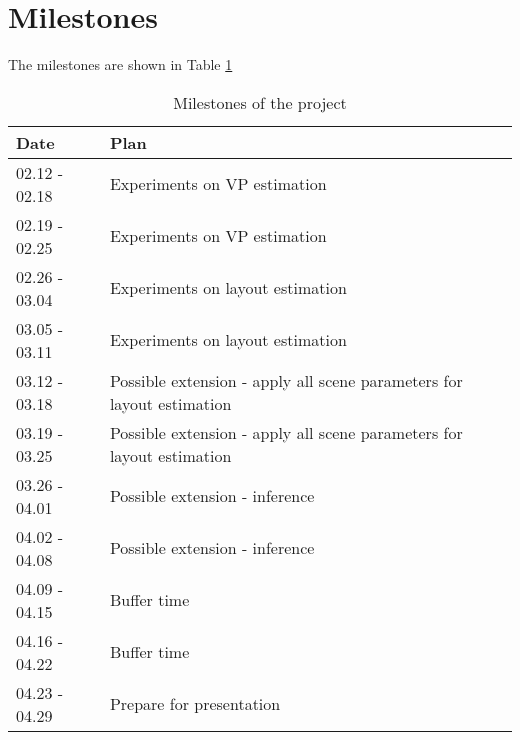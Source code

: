 \section{Milestones}
\label{sec:6}

The milestones are shown in Table \ref{tab:6}
\begin{table}[t]
  \centering
  \begin{tabular}{|l|p{5.5 cm}|}
    \hline
    Date          & Plan \\
    \hline
    02.12 - 02.18 & Experiments on VP estimation \\
    02.19 - 02.25 & Experiments on VP estimation \\
    02.26 - 03.04 & Experiments on layout estimation \\
    03.05 - 03.11 & Experiments on layout estimation \\
    03.12 - 03.18 & Possible extension - apply all scene parameters for layout estimation \\
    03.19 - 03.25 & Possible extension - apply all scene parameters for layout estimation \\
    03.26 - 04.01 & Possible extension - inference \\
    04.02 - 04.08 & Possible extension - inference \\
    04.09 - 04.15 & Buffer time \\
    04.16 - 04.22 & Buffer time \\
    04.23 - 04.29 & Prepare for presentation \\
    \hline
  \end{tabular}
  \caption{Milestones of the project}
  \label{tab:6}
\end{table}

